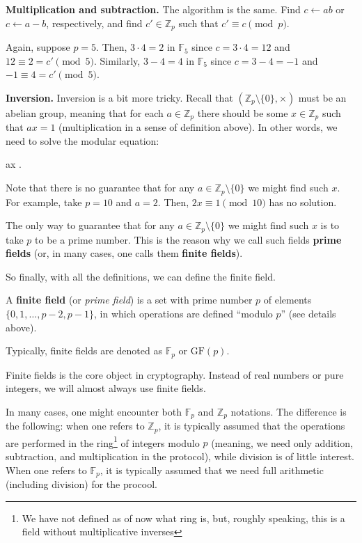 \documentclass[../lecture-notes-148x210.tex]{subfiles}
\begin{document}
\textbf{Multiplication and subtraction.} The algorithm is the same. Find $c \gets ab$ or $c \gets a-b$, respectively, and find $c' \in \mathbb{Z}_p$ such that $c' \equiv c \pmod{p}$.

\begin{example}
    Again, suppose $p=5$. Then, $3 \cdot 4 = 2$ in $\mathbb{F}_5$ since $c=3 \cdot 4 = 12$ and $12 \equiv 2 = c' \pmod{5}$. Similarly, $3-4 = 4$ in $\mathbb{F}_5$ since $c=3-4=-1$ and $-1 \equiv 4 = c' \pmod{5}$.
\end{example}

\textbf{Inversion.} Inversion is a bit more tricky. Recall that $(\mathbb{Z}_p \setminus \{0\}, \times)$ must be an abelian group, meaning that for each $a \in \mathbb{Z}_p$ there should be some $x \in \mathbb{Z}_p$ such that $ax = 1$ (multiplication in a sense of definition above). In other words, we need to solve the modular equation:
\begin{xequation}
    ax  .
\end{xequation}

Note that there is no guarantee that for any $a \in \mathbb{Z}_p \setminus \{0\}$ we might find such $x$. For example, take $p=10$ and $a=2$. Then, $2x \equiv 1 \pmod{10}$ has no solution. 

The only way to guarantee that for any $a \in \mathbb{Z}_p \setminus \{0\}$ we might find such $x$ is to take $p$ to be a prime number. This is the reason why we call such fields \textbf{prime fields} (or, in many cases, one calls them \textbf{finite fields}).

So finally, with all the definitions, we can define the finite field.

\begin{definition}
    A \textbf{finite field} (or \textit{prime field}) is a set with prime number $p$ of elements $\{0,1,\dots,p-2,p-1\}$, in which operations are defined ``modulo $p$'' (see details above). 

    Typically, finite fields are denoted as $\mathbb{F}_p$ or $\text{GF}(p)$.
\end{definition}

Finite fields is the core object in cryptography. Instead of real numbers or pure integers, we will almost always use finite fields.

\begin{remark}
    In many cases, one might encounter both $\mathbb{F}_p$ and $\mathbb{Z}_p$ notations. The difference is the following: when one refers to $\mathbb{Z}_p$, it is typically assumed that the operations are performed in the ring\footnote{We have not defined as of now what ring is, but, roughly speaking, this is a field without multiplicative inverses} of integers modulo $p$ (meaning, we need only addition, subtraction, and multiplication in the protocol), while division is of little interest. When one refers to $\mathbb{F}_p$, it is typically assumed that we need full arithmetic (including division) for the procool.
\end{remark}
\end{document}

